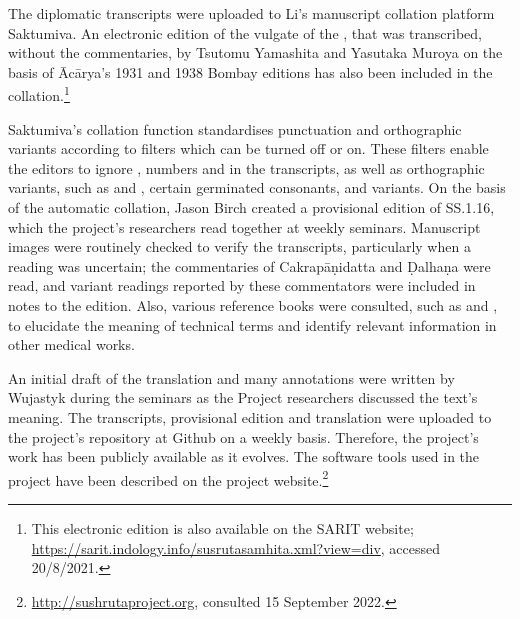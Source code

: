 The diplomatic transcripts were uploaded to Li's manuscript collation platform
Saktumiva. An electronic edition of the vulgate of the \SS, that was transcribed,
without the commentaries, by Tsutomu Yamashita and Yasutaka Muroya on the basis of
Ācārya's 1931 and 1938 Bombay editions has also been included in the
collation.\footnote{This electronic edition is also available on the SARIT
    website; \url{https://sarit.indology.info/susrutasamhita.xml?view=div}, accessed
    20/8/2021.}

Saktumiva's  collation function standardises punctuation and 
orthographic variants according to filters which can be turned off or on. These 
filters enable the editors to ignore , numbers and 
 in the transcripts, as well as orthographic variants, such as 
 and , certain germinated consonants, and  
variants. On the basis of the automatic collation, Jason Birch created a provisional 
edition of SS.1.16, which the project's researchers read together at weekly 
seminars. Manuscript images were routinely checked to verify the transcripts, 
particularly when a reading was uncertain; the commentaries of Cakrapāṇidatta 
and Ḍalhaṇa were read, and variant readings reported by these commentators 
were included in notes to the edition. Also, various reference books were 
consulted, such as   \citet{josi-maha,nadk-1954} and \citet{meul-hist}, to 
elucidate the meaning of technical terms and identify relevant information in 
other medical works. 

An initial draft of the translation and many annotations were written by  
Wujastyk during the seminars as the Project researchers discussed the text's 
meaning. The transcripts, provisional edition and translation were uploaded to the 
project's repository at Github on a weekly basis. Therefore, the project's work has 
been publicly available as it evolves. The software tools used in the project have been 
described on the project website.\footnote{\url{http://sushrutaproject.org}, consulted
    15 September 2022.}

